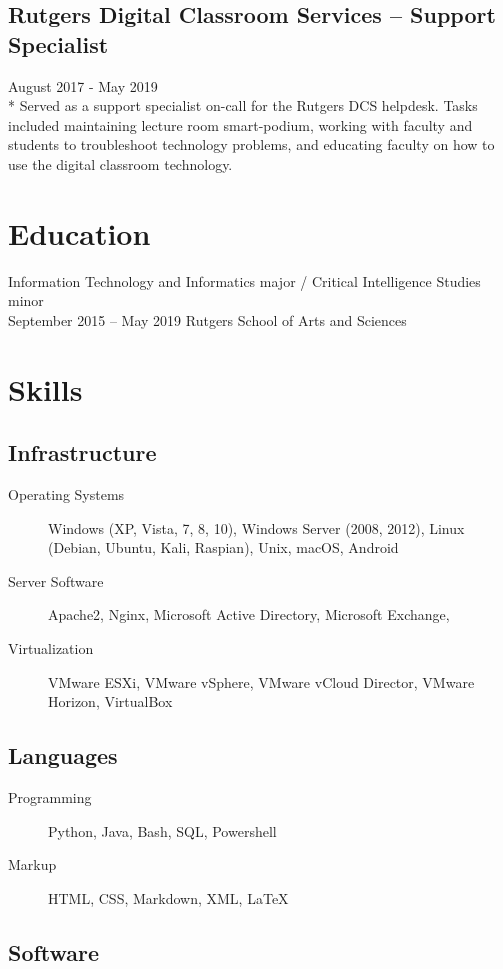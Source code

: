 \documentclass{article}
\begin{document}
\begin{samepage}
\subsection{Rutgers Digital Classroom Services -- Support Specialist}
August 2017 - May 2019\\*
Served as a support specialist on-call for the Rutgers DCS helpdesk. Tasks included maintaining lecture room smart-podium, working with faculty and students to troubleshoot technology problems, and educating faculty on how to use the digital classroom technology.

\section{Education}
Information Technology and Informatics major /  
Critical Intelligence Studies minor \\
September 2015 -- May 2019
Rutgers School of Arts and Sciences

\section{Skills}

\subsection{Infrastructure} 
\begin{description}
\item[Operating Systems] Windows (XP, Vista, 7, 8, 10), Windows Server (2008, 2012), Linux (Debian, Ubuntu, Kali, Raspian), Unix,  macOS, Android
\item[Server Software] Apache2, Nginx, Microsoft Active Directory, Microsoft Exchange,    
\item[Virtualization] VMware ESXi, VMware vSphere, VMware vCloud Director, VMware Horizon, VirtualBox
\end{description}	

\subsection{Languages}
\begin{description}
\item[Programming] Python, Java, Bash, SQL, Powershell
\item[Markup] HTML, CSS, Markdown, XML, {\LaTeX}
\end{description}

\subsection{Software}


\end{samepage}
\end{document}
